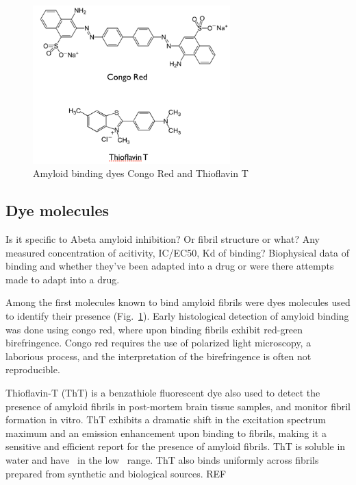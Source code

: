 \begin{figure}
\centering
\includegraphics[width=3in]{figures/introduction/dyes.png}
\caption[Small molecule binders]{Amyloid binding dyes Congo Red and Thioflavin T}
\label{fig:amyloid_dyes}
\end{figure}

\subsection{Dye molecules}

Is it specific to Abeta amyloid inhibition? Or fibril structure or what? 
Any measured concentration of acitivity, IC/EC50, Kd of binding?
Biophysical data of binding and whether they've been adapted into a drug or were there attempts made to adapt into a drug.

Among the first molecules known to bind amyloid fibrils were dyes molecules used to identify their presence (Fig.~\ref{fig:amyloid_dyes}). Early histological detection of amyloid binding was done using congo red, where upon binding fibrils exhibit red-green birefringence. Congo red requires the use of polarized light microscopy, a laborious process, and the interpretation of the birefringence is often not reproducible.

Thioflavin-T (ThT) is a benzathiole fluorescent dye also used to detect the presence of amyloid fibrils in post-mortem brain tissue samples, and monitor fibril formation in vitro. ThT exhibits a dramatic shift in the excitation spectrum maximum and an emission enhancement upon binding to fibrils, making it a sensitive and efficient report for the presence of amyloid fibrils.  ThT is soluble in water and have \KD\ in the low \micromolar\ range.  ThT also binds uniformly across fibrils prepared from synthetic and biological sources.
REF

